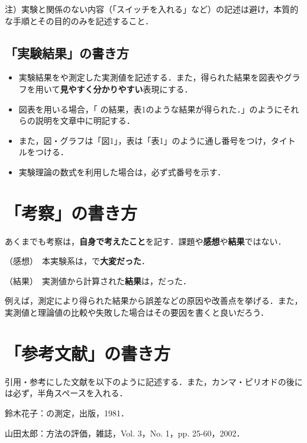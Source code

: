 \documentclass[a4paper,11pt]{ltjsarticle}
\begin{document}
注）実験と関係のない内容（「スイッチを入れる」など）の記述は避け，本質的な手順とその目的のみを記述すること．

\subsection{「実験結果」の書き方}

\begin{itemize}
  \item 実験結果をや測定した実測値を記述する．また，得られた結果を図表やグラフを用いて\textbf{見やすく分かりやすい}表現にする．
  \item 図表を用いる場合，「 \bigcirc\bigcirc の結果，表1のような結果が得られた．」のようにそれらの説明を文章中に明記する．
  \item また，図・グラフは「図1」，表は「表1」のように通し番号をつけ，タイトルをつける．
  \item 実験理論の数式を利用した場合は，必ず式番号を示す．
\end{itemize}

\section{「考察」の書き方}

あくまでも考察は，\textbf{自身で考えたこと}を記す．課題や\textbf{感想}や\textbf{結果}ではない．

\vspace{10pt}

（感想）\ 本実験系は，\bigcirc\bigcirc で\textbf{大変だった}．

（結果）\ 実測値から計算された\textbf{結果}は，\bigcirc\bigcirc だった．


\clearpage

例えば，測定により得られた結果から誤差などの原因や改善点を挙げる．また，実測値と理論値の比較や失敗した場合はその要因を書くと良いだろう．

\section{「参考文献」の書き方}

引用・参考にした文献を以下のように記述する．また，カンマ・ピリオドの後には必ず，半角スペースを入れる．

\begin{enumerate}[label={[}\arabic*{]}]
  \item 鈴木花子：\bigcirc\bigcirc の測定，\square\square 出版，1981．
  \item 山田太郎：\bigcirc\bigcirc 方法の評価，\square\square 雑誌，Vol. 3，No. 1，pp. 25-60，2002．
\end{enumerate}
\end{document}
